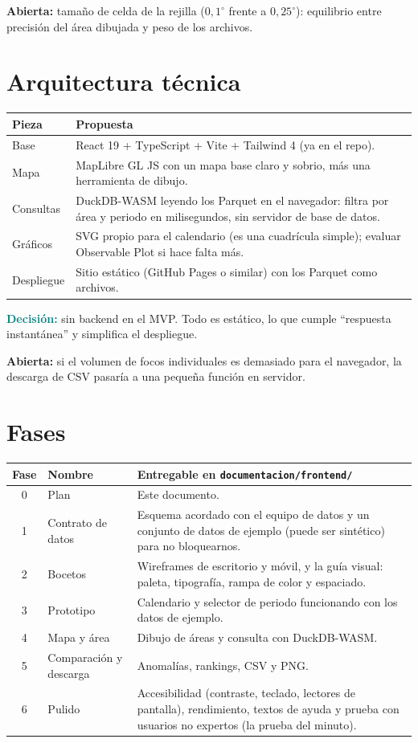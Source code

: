 \documentclass[11pt,a4paper]{article}
\newcommand{\decision}[1]{\textcolor{teal}{\textbf{Decisión:}} #1}
\newcommand{\abierta}[1]{\textcolor{orange!80!black}{\textbf{Abierta:}} #1}
\begin{document}
\abierta{tamaño de celda de la rejilla ($0{,}1^\circ$ frente a $0{,}25^\circ$): equilibrio
entre precisión del área dibujada y peso de los archivos.}

\section{Arquitectura técnica}

\begin{tabularx}{\linewidth}{@{}lX@{}}
\toprule
Pieza & Propuesta \\
\midrule
Base & React 19 + TypeScript + Vite + Tailwind 4 (ya en el repo). \\
Mapa & MapLibre GL JS con un mapa base claro y sobrio, más una herramienta de dibujo. \\
Consultas & DuckDB-WASM leyendo los Parquet en el navegador: filtra por área y periodo
  en milisegundos, sin servidor de base de datos. \\
Gráficos & SVG propio para el calendario (es una cuadrícula simple); evaluar
  Observable Plot si hace falta más. \\
Despliegue & Sitio estático (GitHub Pages o similar) con los Parquet como archivos. \\
\bottomrule
\end{tabularx}

\decision{sin backend en el MVP. Todo es estático, lo que cumple ``respuesta instantánea''
y simplifica el despliegue.}

\abierta{si el volumen de focos individuales es demasiado para el navegador, la descarga
de CSV pasaría a una pequeña función en servidor.}

\section{Fases}\label{sec:fases}

\begin{tabularx}{\linewidth}{@{}clX@{}}
\toprule
Fase & Nombre & Entregable en \texttt{documentacion/frontend/} \\
\midrule
0 & Plan & Este documento. \\
1 & Contrato de datos & Esquema acordado con el equipo de datos y un conjunto de
  datos de ejemplo (puede ser sintético) para no bloquearnos. \\
2 & Bocetos & Wireframes de escritorio y móvil, y la guía visual: paleta, tipografía,
  rampa de color y espaciado. \\
3 & Prototipo & Calendario y selector de periodo funcionando con los datos de ejemplo. \\
4 & Mapa y área & Dibujo de áreas y consulta con DuckDB-WASM. \\
5 & Comparación y descarga & Anomalías, rankings, CSV y PNG. \\
6 & Pulido & Accesibilidad (contraste, teclado, lectores de pantalla), rendimiento,
  textos de ayuda y prueba con usuarios no expertos (la prueba del minuto). \\
\bottomrule
\end{tabularx}
\end{document}
